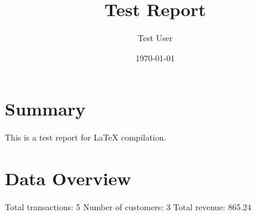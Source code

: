 \documentclass{article}
\begin{document}
\title{Test Report}
\author{Test User}
\date{\today}
\maketitle
\section{Summary}
This is a test report for LaTeX compilation.
\section{Data Overview}
Total transactions: 5
Number of customers: 3
Total revenue: 865.24
\end{document}
